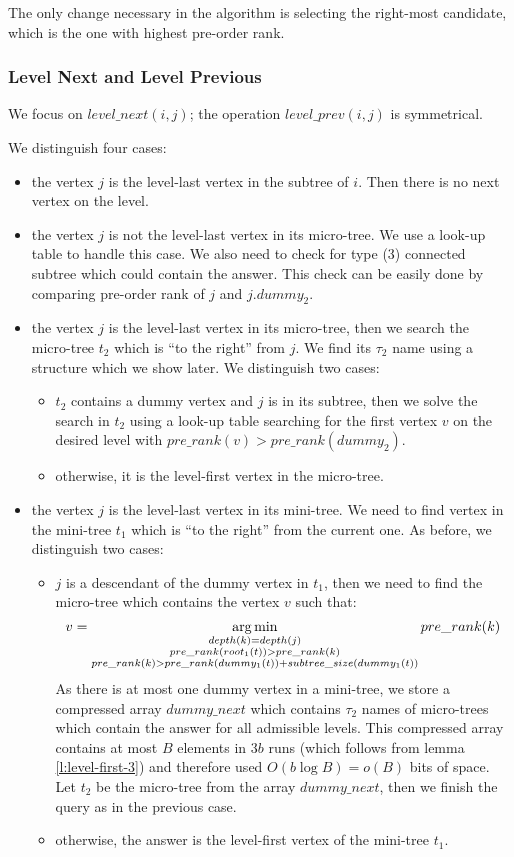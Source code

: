 The only change necessary in the algorithm is selecting the right-most candidate, which is the one with highest pre-order rank.

\subsubsection{Level Next and Level Previous}

We focus on $level\_next(i, j)$; the operation $level\_prev(i, j)$ is symmetrical.

We distinguish four cases:
\begin{itemize}
	\item the vertex $j$ is the level-last vertex in the subtree of $i$.
	Then there is no next vertex on the level.
	\item the vertex $j$ is not the level-last vertex in its micro-tree.
	We use a look-up table to handle this case.
	We also need to check for type (3) connected subtree which could contain the answer.
	This check can be easily done by comparing pre-order rank of $j$ and $j.dummy_2$.
	\item the vertex $j$ is the level-last vertex in its micro-tree, then we search the micro-tree $t_2$ which is ``to the right'' from $j$.
	We find its $\tau_2$ name using a structure which we show later.
	We distinguish two cases:
	\begin{itemize}
		\item $t_2$ contains a dummy vertex and $j$ is in its subtree, then we solve the search in $t_2$ using a look-up table searching for the first vertex $v$ on the desired level with $pre\_rank(v) > pre\_rank(dummy_2)$.
		\item otherwise, it is the level-first vertex in the micro-tree.
	\end{itemize}
	\item the vertex $j$ is the level-last vertex in its mini-tree.
	We need to find vertex in the mini-tree $t_1$ which is ``to the right'' from the current one.
	As before, we distinguish two cases:
	\begin{itemize}
		\item $j$ is a descendant of the dummy vertex in $t_1$, then we need to find the micro-tree which contains the vertex $v$ such that:
		$$ v = \operatorname*{arg\,min}_{\substack{depth(k) = depth(j) \\ pre\_rank(root_1(t))> pre\_rank(k) \\ pre\_rank(k) > pre\_rank(dummy_1(t)) + subtree\_size(dummy_1(t))}} pre\_rank(k)$$
		As there is at most one dummy vertex in a mini-tree, we store a compressed array $dummy\_next$ which contains $\tau_2$ names of micro-trees which contain the answer for all admissible levels.
		This compressed array contains at most $B$ elements in $3b$ runs (which follows from lemma \ref{l:level-first-3}) and therefore used $O(b \log B) = o(B)$ bits of space.
		Let $t_2$ be the micro-tree from the array $dummy\_next$, then we finish the query as in the previous case.
		\item otherwise, the answer is the level-first vertex of the mini-tree $t_1$.
	\end{itemize}
\end{itemize}

